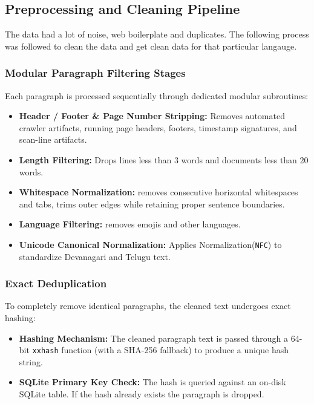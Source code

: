 \documentclass[8pt]{article}
\begin{document}
\subsection{Preprocessing and Cleaning Pipeline}
\label{sec:preprocessing}

The data had a lot of noise, web boilerplate and duplicates. The following process was followed to clean the data and get clean data for that particular langauge.
\subsubsection{Modular Paragraph Filtering Stages}
Each paragraph is processed sequentially through dedicated modular subroutines:
\begin{itemize}
    \item \textbf{Header / Footer \& Page Number Stripping:} Removes automated crawler artifacts, running page headers, footers, timestamp signatures, and scan-line artifacts.
    \item \textbf{Length Filtering:} Drops lines less than 3 words and documents less than 20 words.
    \item \textbf{Whitespace Normalization:} removes consecutive horizontal whitespaces and tabs, trims outer edges while retaining proper sentence boundaries.
    \item \textbf{Language Filtering:} removes emojis and other languages.
    \item \textbf{Unicode Canonical Normalization:} Applies Normalization(\texttt{NFC}) to standardize Devanagari and Telugu text.
\end{itemize}

\subsubsection{Exact Deduplication}
To completely remove identical paragraphs, the cleaned text undergoes exact hashing:
\begin{itemize}
    \item \textbf{Hashing Mechanism:} The cleaned paragraph text is passed through a 64-bit \texttt{xxhash} function (with a SHA-256 fallback) to produce a unique hash string.
    \item \textbf{SQLite Primary Key Check:} The hash is queried against an on-disk SQLite table. If the hash already exists the paragraph is dropped.
\end{itemize}
\end{document}
